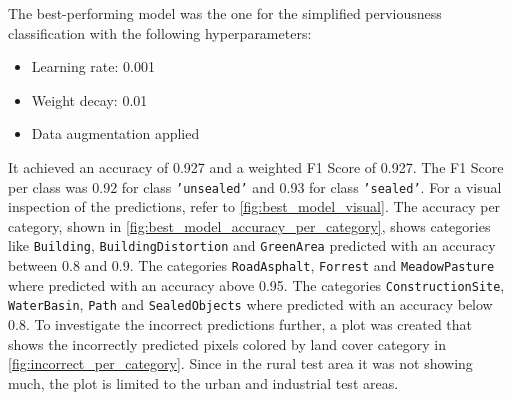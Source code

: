 The best-performing model was the one for the simplified perviousness classification
with the following hyperparameters:
\begin{itemize}
    \item Learning rate: 0.001
    \item Weight decay: 0.01
    \item Data augmentation applied
\end{itemize}
It achieved an accuracy of 0.927 and a weighted F1 Score of 0.927.
The F1 Score per class was 0.92 for class \texttt{'unsealed'} and 0.93 for class \texttt{'sealed'}.
For a visual inspection of the predictions, refer to \autoref{fig:best_model_visual}.
The accuracy per category, shown in \autoref{fig:best_model_accuracy_per_category}, shows categories
like \texttt{Building}, \texttt{BuildingDistortion} and \texttt{GreenArea} predicted with an accuracy between 0.8 and 0.9.
The categories \texttt{RoadAsphalt}, \texttt{Forrest} and \texttt{MeadowPasture} where predicted with an accuracy above 0.95.
The categories \texttt{ConstructionSite}, \texttt{WaterBasin}, \texttt{Path} and \texttt{SealedObjects} where predicted with
an accuracy below 0.8. To investigate the incorrect predictions further, a plot was created that shows the incorrectly
predicted pixels colored by land cover category in \autoref{fig:incorrect_per_category}. Since in the
rural test area it was not showing much, the plot is limited to the urban and industrial test areas.

